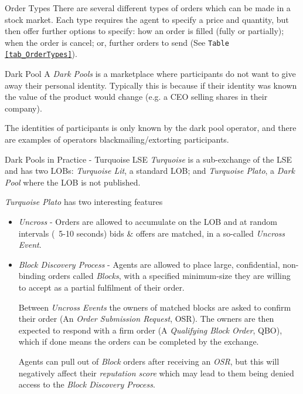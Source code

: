 \documentclass[11pt,a4paper]{article}
\begin{document}
  \begin{proposition}{Order Types}
    There are several different types of orders which can be made in a stock market. Each type requires the agent to specify a price and quantity, but then offer further options to specify: how an order is filled (fully or partially); when the order is cancel; or, further orders to send (See \texttt{Table \ref{tab_OrderTypes}}).
  \end{proposition}

  \begin{definition}{Dark Pool}
    A \textit{Dark Pools} is a marketplace where participants do not want to give away their personal identity. Typically this is because if their identity was known the value of the product would change (e.g. a CEO selling shares in their company).
    \par The identities of participants is only known by the dark pool operator, and there are examples of operators blackmailing/extorting participants.
  \end{definition}

  \begin{remark}{Dark Pools in Practice - Turquoise LSE}
    \textit{Turquoise} is a sub-exchange of the LSE and has two LOBs: \textit{Turquoise Lit}, a standard LOB; and \textit{Turquoise Plato}, a \textit{Dark Pool} where the LOB is not published. %
    \par \textit{Turquoise Plato} has two interesting features
    \begin{itemize}
      \item \textit{Uncross} - Orders are allowed to accumulate on the LOB and at random intervals (~5-10 seconds) bids \& offers are matched, in a so-called \textit{Uncross Event}.
      \item \textit{Block Discovery Process} - Agents are allowed to place large, confidential, non-binding orders called \textit{Blocks}, with a specified minimum-size they are willing to accept as a partial fulfilment of their order.
      \par Between \textit{Uncross Events} the owners of matched blocks are asked to confirm their order (An \textit{Order Submission Request}, OSR). The owners are then expected to respond with a firm order (A \textit{Qualifying Block Order}, QBO), which if done means the orders can be completed by the exchange.
      \par Agents can pull out of \textit{Block} orders after receiving an \textit{OSR}, but this will negatively affect their \textit{reputation score} which may lead to them being denied access to the \textit{Block Discovery Process}.
    \end{itemize}
  \end{remark}
\end{document}
